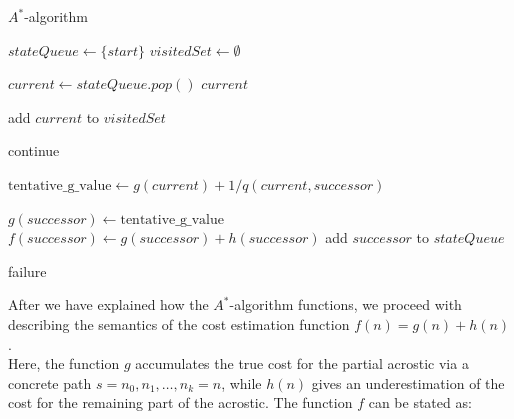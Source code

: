 \documentclass[11pt]{reportAlternative}
\begin{document}
\newpage

\begin{algorithm}
\caption{$A^*$-algorithm}\label{Astar}
\begin{algorithmic}[1]




\State $stateQueue\gets \{start\}$
\State $visitedSet\gets \emptyset$

\State $current\gets stateQueue.pop()$
\State \Return $current$ 
\EndIf

\State add $current$ to $visitedSet$




			 \State continue
		\EndIf
			
		\State
		\State $\textrm{tentative\_g\_value} \gets g(current) + 1/q(current,successor)$		
		\State



			\State $g(successor)\gets \mathrm{tentative\_g\_value}$
			\State $f(successor)\gets g(successor) + h(successor)$
				\State add $successor$ to $stateQueue$
			\EndIf
		\EndIf

			

		


	\EndFor


			
			
	
	
	
	
	
				
			
\EndWhile			 
	




\Return failure
 



\EndFunction
\end{algorithmic}
\end{algorithm}


After we have explained how the $A^*$-algorithm functions, we proceed with describing the semantics of the cost estimation function $f(n)=g(n) + h(n)$.\\
Here, the function $g$ accumulates the true cost for the partial acrostic via a concrete path $s=n_0,n_1,\dots,n_k=n$, while $h(n)$ gives an underestimation of the cost for the remaining part of the acrostic. The function $f$ can be stated as:
  
\end{document}
